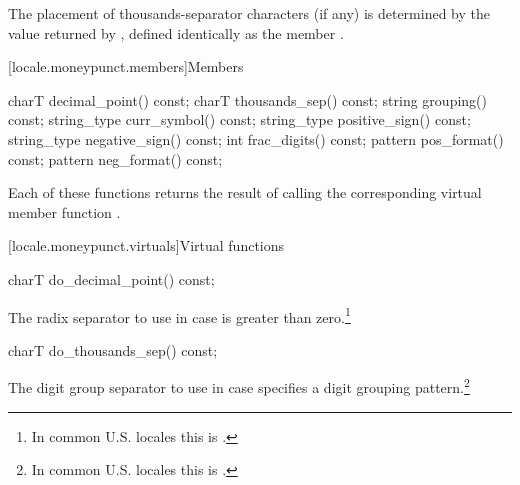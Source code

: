 \pnum
The placement of thousands-separator characters (if any)
is determined by the value returned by
,
defined identically as the member
.

[locale.moneypunct.members]{Members}

%
%
%
%
%
%
%
%
%
\begin{codeblock}
charT        decimal_point() const;
charT        thousands_sep() const;
string       grouping()      const;
string_type  curr_symbol()   const;
string_type  positive_sign() const;
string_type  negative_sign() const;
int          frac_digits()   const;
pattern      pos_format()    const;
pattern      neg_format()    const;
\end{codeblock}

\pnum
Each of these functions 
returns the result of calling the corresponding
virtual member function
.

[locale.moneypunct.virtuals]{Virtual functions}

%
\begin{itemdecl}
charT do_decimal_point() const;
\end{itemdecl}

\begin{itemdescr}
\pnum
\returns
The radix separator to use in case
is greater than zero.\footnote{In common U.S. locales this is
.}
\end{itemdescr}

%
\begin{itemdecl}
charT do_thousands_sep() const;
\end{itemdecl}

\begin{itemdescr}
\pnum
\returns
The digit group separator to use in case
specifies a digit grouping pattern.\footnote{In common U.S. locales this is
.}
\end{itemdescr}

